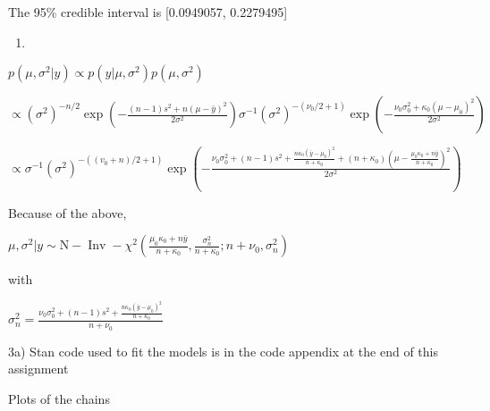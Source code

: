 \documentclass[
]{article}
\begin{document}
The 95\% credible interval is {[}0.0949057, 0.2279495{]}

\begin{enumerate}
\def\labelenumi{\arabic{enumi})}
\setcounter{enumi}{1}
\item
\end{enumerate}

\(p\left(\mu, \sigma^{2} | y\right) \propto p\left(y | \mu, \sigma^{2}\right) p\left(\mu, \sigma^{2}\right)\)

\(\propto\left(\sigma^{2}\right)^{-n / 2} \exp \left(-\frac{(n-1) s^{2}+n(\mu-\bar{y})^{2}}{2 \sigma^{2}}\right) \sigma^{-1}\left(\sigma^{2}\right)^{-\left(\nu_{0} / 2+1\right)} \exp \left(-\frac{\nu_{0} \sigma_{0}^{2}+\kappa_{0}\left(\mu-\mu_{0}\right)^{2}}{2 \sigma^{2}}\right)\)

\(\propto \sigma^{-1}\left(\sigma^{2}\right)^{-\left(\left(v_{0}+n\right) / 2+1\right)} \exp \left(-\frac{\nu_{0} \sigma_{0}^{2}+(n-1) s^{2}+\frac{n \kappa_{0}\left(\bar{y}-\mu_{0}\right)^{2}}{n+\kappa_{0}}+\left(n+\kappa_{0}\right)\left(\mu-\frac{\mu_{0} \kappa_{0}+n \bar{y}}{n+\kappa_{0}}\right)^{2}}{2 \sigma^{2}}\right)\)

Because of the above,

\(\mu, \sigma^{2} | y \sim \mathrm{N}-\operatorname{Inv}-\chi^{2}\left(\frac{\mu_{0} \kappa_{0}+n \bar{y}}{n+\kappa_{0}}, \frac{\sigma_{n}^{2}}{n+\kappa_{0}} ; n+\nu_{0}, \sigma_{n}^{2}\right)\)

with

\(\sigma_{n}^{2}=\frac{\nu_{0} \sigma_{0}^{2}+(n-1) s^{2}+\frac{n \kappa_{0}\left(\bar{y}-\mu_{0}\right)^{2}}{n+\kappa_{0}}}{n+\nu_{0}}\)

3a) Stan code used to fit the models is in the code appendix at the end
of this assignment

Plots of the chains
\end{document}
